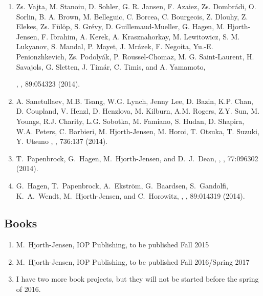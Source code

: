 \documentclass[prc,amsart,english,twocolumn,superscriptaddress,showpacs,floatfix]{revtex4}
\begin{document}
\begin{enumerate}
\item Zs. Vajta, M. Stanoiu, D. Sohler, G. R. Jansen, F. Azaiez, Zs. Dombrádi, O. Sorlin, B. A. Brown, M. Belleguic, C. Borcea, C. Bourgeois, Z. Dlouhy, Z. Elekes, Zs. Fülöp, S. Grévy, D. Guillemaud-Mueller, G. Hagen, M. Hjorth-Jensen, F. Ibrahim, A. Kerek, A. Krasznahorkay, M. Lewitowicz, S. M. Lukyanov, S. Mandal, P. Mayet, J. Mrázek, F. Negoita, Yu.-E. Penionzhkevich, Zs. Podolyák, P. Roussel-Chomaz, M. G. Saint-Laurent, H. Savajols, G. Sletten, J. Timár, C. Timis, and A. Yamamoto,

, 
, 89:054323 (2014).

\item A. Sanetullaev, M.B. Tsang, W.G. Lynch, Jenny Lee, D. Bazin, K.P. Chan, D. Coupland, V. Henzl, D. Henzlova, M. Kilburn, A.M. Rogers, Z.Y. Sun, M. Youngs, R.J. Charity, L.G. Sobotka, M. Famiano, S. Hudan, D. Shapira, W.A. Peters, C. Barbieri, M. Hjorth-Jensen, M. Horoi, T. Otsuka, T. Suzuki, Y. Utsuno
, 
, 736:137 (2014).

\item  T.~Papenbrock, G.~Hagen, M.~Hjorth-Jensen, and  D.~J.~Dean, 
, 
, 77:096302 (2014).


\item G.~Hagen, T.~Papenbrock,   A.~Ekstr\"om, G.~Baardsen, S.~Gandolfi, K.~A.~Wendt, M.~Hjorth-Jensen, and C.~Horowitz,
, 
,  89:014319 (2014).



 \end{enumerate}


 \subsection*{Books}
\begin{enumerate}
\item  M.~Hjorth-Jensen, 
\newblock IOP Publishing, to be published Fall 2015
\item  M.~Hjorth-Jensen, 
\newblock IOP Publishing, to be published Fall 2016/Spring 2017
\item I have two more book projects, but they will not be started before the spring of 2016. 
\end{enumerate}
\end{document}
